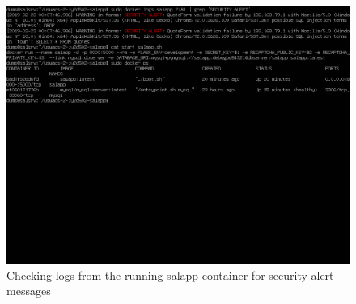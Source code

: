 
\pagebreak
\begin{figure}[h!]
\centering
\captionsetup{skip=\skipfigurecaptionlen}
\includegraphics[width=1\textwidth]{screenshots/IY2D502-2019-02-23-00-23-12.png}
\caption{Checking logs from the running salapp container for security alert messages}
\label{fig:IY2D502-2019-02-23-00-23-12}
\end{figure}
\pagebreak


